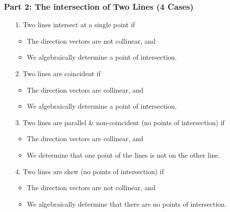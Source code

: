 \documentclass{article}
\begin{document}
\subsubsection{Part 2: The intersection of Two Lines (4 Cases)}
\begin{enumerate}
    \item[1.] Two lines intersect at a single point if
    \begin{itemize}
        \item The direction vectors are not collinear, and
        \item We algebraically determine a point of intersection.
    \end{itemize}
    \item[2.] Two lines are coincident if
    \begin{itemize}
        \item The direction vectors are collinear, and
        \item We algebraically determine a point of intersection.
    \end{itemize}
    \item[3.] Two lines are parallel \& non-coincident (no points of intersection) if
    \begin{itemize}
        \item The direction vectors are collinear, and
        \item We determine that one point of the lines is not on the other line.
    \end{itemize}
    \item[4.] Two lines are skew (no points of intersection) if
    \begin{itemize}
        \item The direction vectors are not collinear, and
        \item We algebraically determine that there are no points of intersection.
    \end{itemize}
\end{enumerate}
\vspace{2em}
\end{document}
